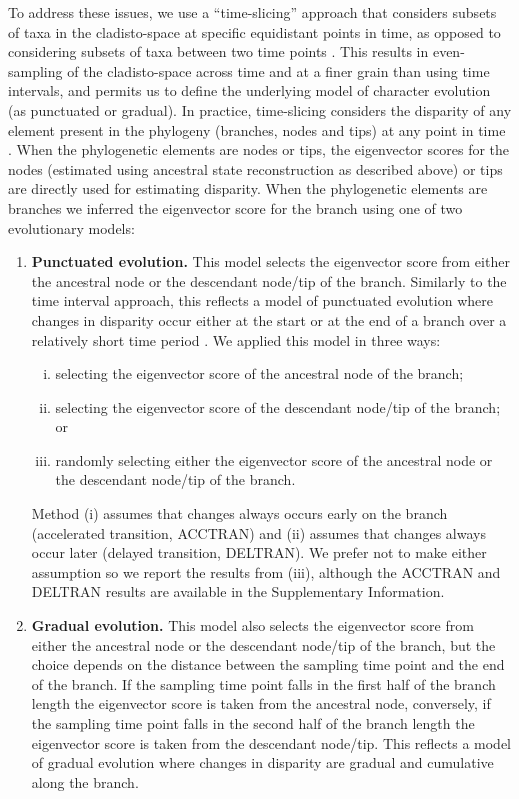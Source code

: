\documentclass[12pt,letterpaper]{article}
\begin{document}
To address these issues, we use a ``time-slicing'' approach that considers subsets of taxa in the cladisto-space at specific equidistant points in time, as opposed to considering subsets of taxa between two time points %
.
This results in even-sampling of the cladisto-space across time and at a finer grain than using time intervals, and permits us to define the underlying model of character evolution (as punctuated or gradual).  
In practice, time-slicing considers the disparity of any element present in the phylogeny (branches, nodes and tips) at any point in time %
.
When the phylogenetic elements are nodes or tips, the eigenvector scores for the nodes (estimated using ancestral state reconstruction as described above) or tips are directly used for estimating disparity.
When the phylogenetic elements are branches we inferred the eigenvector score for the branch using one of two evolutionary models:
\begin{enumerate}
    \item{\textbf{Punctuated evolution.}} 
    This model selects the eigenvector score from either the ancestral node or the descendant node/tip of the branch. 
    Similarly to the time interval approach, this reflects a model of punctuated evolution where changes in disparity occur either at the start or at the end of a branch over a relatively short time period \citep{Gould1977}.
    We applied this model in three ways: 
    \begin{enumerate}[(i)]
      \item selecting the eigenvector score of the ancestral node of the branch; 
      \item selecting the eigenvector score of the descendant node/tip of the branch; or 
      \item randomly selecting either the eigenvector score of the ancestral node or the descendant node/tip of the branch.
    \end{enumerate}
    Method (i) assumes that changes always occurs early on the branch (accelerated transition, ACCTRAN) and (ii) assumes that changes always occur later (delayed transition, DELTRAN).
    We prefer not to make either assumption so we report the results from (iii), although the ACCTRAN and DELTRAN results are available in the Supplementary Information. %
    \item{\textbf{Gradual evolution.}}
    This model also selects the eigenvector score from either the ancestral node or the descendant node/tip of the branch, but the choice depends on the distance between the sampling time point and the end of the branch.
    If the sampling time point falls in the first half of the branch length the eigenvector score is taken from the ancestral node, conversely, if the sampling time point falls in the second half of the branch length the eigenvector score is taken from the descendant node/tip.
    This reflects a model of gradual evolution where changes in disparity are gradual and cumulative along the branch.
\end{enumerate}
\end{document}
